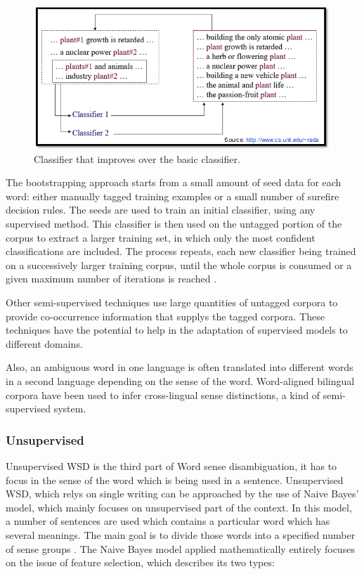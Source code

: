 \begin{figure}[tbh]
	\begin{center}
		\includegraphics[width=\columnwidth]{Union_Background_Chart_semi}
	\end{center}
	\caption{Classifier that improves over the basic classifier. \label{fig3}}
\end{figure}

The bootstrapping approach starts from a small amount of seed data for each word: either manually tagged training examples or a small number of surefire decision rules. 
The seeds are used to train an initial classifier, using any supervised method. This classifier is then used on the untagged portion of the corpus to extract a larger training set, in which only the most confident classifications are included. 
The process repeats, each new classifier being trained on a successively larger training corpus, until the whole corpus is consumed or a given maximum number of iterations is reached \cite{Blascheck2016}.

Other semi-supervised techniques use large quantities of untagged corpora to provide co-occurrence information that supplys the tagged corpora. 
These techniques have the potential to help in the adaptation of supervised models to different domains.

Also, an ambiguous word in one language is often translated into different words in a second language depending on the sense of the word. 
Word-aligned bilingual corpora have been used to infer cross-lingual sense distinctions, a kind of semi-supervised system.\cite{Cheslow2014}

\subsubsection*{Unsupervised}
Unsupervised WSD is the third part of Word sense disambiguation, it has to focus in the sense of the word which is being used in a sentence. 
Unsupervised WSD, which relys on single writing can be approached by the use of Naive Bayes' model, which mainly focuses on unsupervised part of the context. 
In this model, a number of sentences are used which contains a particular word which has several meanings. 
The main goal is to divide those words into a specified number of sense groups \cite{4028513}. 
The Naive Bayes model applied mathematically entirely focuses on the issue of feature selection, which describes its two types:

